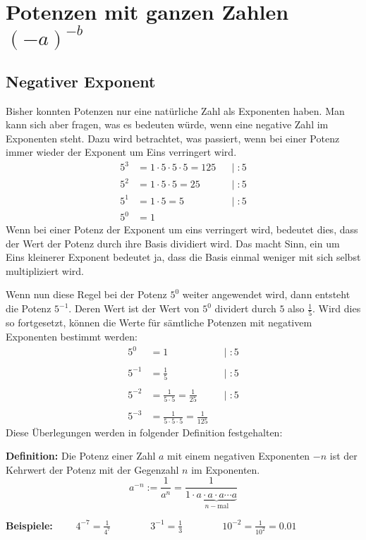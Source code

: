 \newpage
\section{Potenzen mit ganzen Zahlen $(-a)^{-b}$}

\subsection{Negativer Exponent}

Bisher konnten Potenzen nur eine natürliche Zahl als Exponenten haben. Man kann sich aber fragen, was es bedeuten würde, wenn eine negative Zahl im Exponenten steht. Dazu wird betrachtet, was passiert, wenn bei einer Potenz immer wieder der Exponent um Eins verringert wird.
\begin{align*}
  5^{3} &= 1\cdot 5\cdot 5\cdot 5 = 125 && |\; :5\\
  5^{2} &= 1\cdot 5\cdot 5 = 25         && |\; :5\\
  5^{1} &= 1\cdot 5 = 5                 && |\; :5\\
  5^{0} &= 1
\end{align*}
Wenn bei einer Potenz der Exponent um eins verringert wird, bedeutet dies, dass der Wert der Potenz durch ihre Basis dividiert wird. Das macht Sinn, ein um Eins kleinerer Exponent bedeutet ja, dass die Basis einmal weniger mit sich selbst multipliziert wird.

Wenn nun diese Regel bei der Potenz $5^{0}$ weiter angewendet wird, dann entsteht die Potenz $5^{-1}$. Deren Wert ist der Wert von $5^{0}$ dividert durch $5$ also $\frac{1}{5}$. Wird dies so fortgesetzt, können die Werte für sämtliche Potenzen mit negativem Exponenten bestimmt werden:
\begin{align*}
  5^{0}    &= 1                               && |\; :5\\\\
  5^{-1} &= \frac{1}{5}                       && |\; :5\\\\
  5^{-2} &= \frac{1}{5\cdot 5} = \frac{1}{25} && |\; :5\\\\
  5^{-3} &= \frac{1}{5\cdot 5\cdot 5} = \frac{1}{125}
\end{align*}
Diese Überlegungen werden in folgender Definition festgehalten:

\textbf{Definition:} Die Potenz einer Zahl $a$ mit einem negativen Exponenten $-n$ ist der Kehrwert der Potenz mit der Gegenzahl $n$ im Exponenten.
\[
  a^{-n} := \frac{1}{a^{n}} = \frac{1}{1\cdot\underbrace{a\cdot a\cdot a\cdots a}_{n-\text{mal}}}
\]
\begin{example}
  \textbf{Beispiele:} $\displaystyle \qquad 4^{-7} = \frac{1}{4^{7}} \qquad\qquad 3^{-1} = \frac{1}{3} \qquad\qquad 10^{-2} = \frac{1}{10^{2}} = 0.01$
\end{example}

